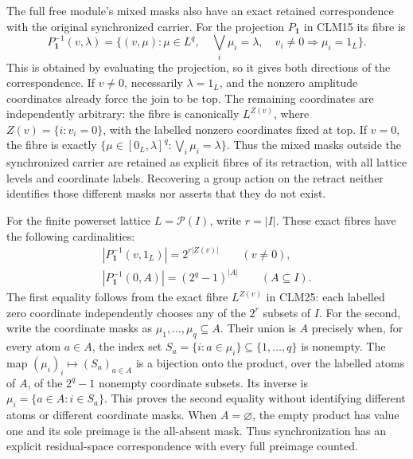 \documentclass[11pt]{article}
\begin{document}
The full free module's mixed masks also have an exact retained
correspondence with the original synchronized carrier. For the
projection $P_{\mathbf1}$ in CLM15 its fibre is
\begin{equation}\tag{CLM25}
P_{\mathbf1}^{-1}(v,\lambda)
 =\{(v,\mu):\mu\in L^q,\quad\bigvee_i\mu_i=\lambda,
                  \quad v_i\ne0\Rightarrow\mu_i=1_L\}.
\end{equation}
This is obtained by evaluating the projection, so it gives both
directions of the correspondence. If $v\ne0$, necessarily
$\lambda=1_L$, and the nonzero amplitude coordinates already force the
join to be top. The remaining coordinates are independently arbitrary:
the fibre is canonically $L^{Z(v)}$, where $Z(v)=\{i:v_i=0\}$, with
the labelled nonzero coordinates fixed at top. If $v=0$, the fibre is
exactly $\{\mu\in[0_L,\lambda]^q:\bigvee_i\mu_i=\lambda\}$.
Thus the mixed masks outside the synchronized carrier are retained as
explicit fibres of its retraction, with all lattice levels and
coordinate labels. Recovering a group action on the retract neither
identifies those different masks nor asserts that they do not exist.

For the finite powerset lattice $L=\mathcal P(I)$, write $r=|I|$.
These exact fibres have the following cardinalities:
\begin{equation}\tag{CLM26}
\begin{gathered}
\left|P_{\mathbf1}^{-1}(v,1_L)\right|
 =2^{r|Z(v)|}\qquad(v\ne0),\\
\left|P_{\mathbf1}^{-1}(0,A)\right|
 =(2^q-1)^{|A|}\qquad(A\subseteq I).
\end{gathered}
\end{equation}
The first equality follows from the exact fibre $L^{Z(v)}$ in CLM25:
each labelled zero coordinate independently chooses any of the $2^r$
subsets of $I$. For the second, write the coordinate masks as
$\mu_1,\ldots,\mu_q\subseteq A$. Their union is $A$ precisely when,
for every atom $a\in A$, the index set
$S_a=\{i:a\in\mu_i\}\subseteq\{1,\ldots,q\}$ is nonempty.
The map $(\mu_i)_i\mapsto(S_a)_{a\in A}$ is a bijection onto the
product, over the labelled atoms of $A$, of the $2^q-1$ nonempty
coordinate subsets. Its inverse is
$\mu_i=\{a\in A:i\in S_a\}$. This proves the second equality without
identifying different atoms or different coordinate masks. When
$A=\varnothing$, the empty product has value one and its sole
preimage is the all-absent mask. Thus synchronization has an explicit
residual-space correspondence with every full preimage counted.
\end{document}
